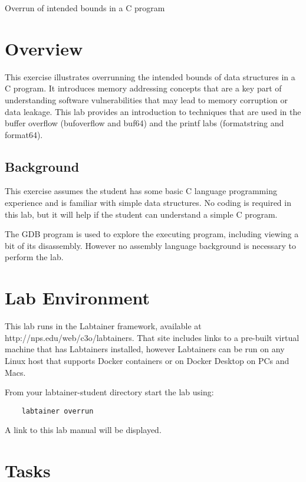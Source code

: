 


\begin{center}
{\LARGE Overrun of intended bounds in a C program}
\vspace{0.1in}\\
\end{center}


\section{Overview}
This exercise illustrates overrunning the intended bounds of
data structures in a C program.   It introduces memory 
addressing concepts that are a key part of understanding software
vulnerabilities that may lead to memory corruption or data leakage.
This lab provides an introduction to techniques that are used
in the buffer overflow (bufoverflow and buf64) and the printf labs
(formatstring and format64).

\subsection{Background}
This exercise assumes the student has some basic C language programming
experience and is familiar with simple data structures.
No coding is required in this lab, but it will help if the student
can understand a simple C program.

The GDB program is used to explore the executing program, including viewing
a bit of its disassembly.  However no assembly language background is necessary to perform
the lab.

\section{Lab Environment}
This lab runs in the Labtainer framework,
available at http://nps.edu/web/c3o/labtainers.
That site includes links to a pre-built virtual machine
that has Labtainers installed, however Labtainers can
be run on any Linux host that supports Docker containers
or on Docker Desktop on PCs and Macs.

From your labtainer-student directory start the lab using:
\begin{verbatim}
    labtainer overrun
\end{verbatim}
A link to this lab manual will be displayed.


\section{Tasks}

